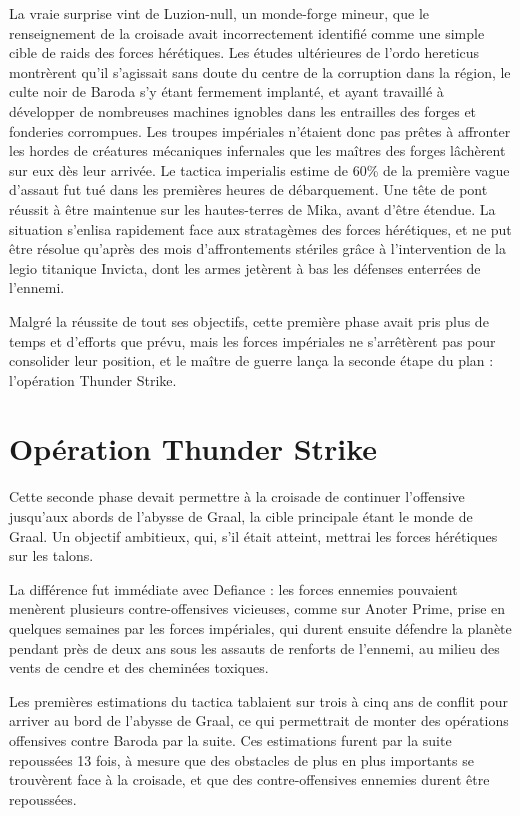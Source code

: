 \documentclass[10pt,a4paper]{book}
\begin{document}
La vraie surprise vint de Luzion-null, un monde-forge mineur, que le renseignement de la croisade avait incorrectement identifié comme une simple cible de raids des forces hérétiques. Les études ultérieures de l'ordo hereticus montrèrent qu'il s'agissait sans doute du centre de la corruption dans la région, le culte noir de Baroda s'y étant fermement implanté, et ayant travaillé à développer de nombreuses machines ignobles dans les entrailles des forges et fonderies corrompues. Les troupes impériales n'étaient donc pas prêtes à affronter les hordes de créatures mécaniques infernales que les maîtres des forges lâchèrent sur eux dès leur arrivée. Le tactica imperialis estime de 60\% de la première vague d'assaut fut tué dans les premières heures de débarquement. Une tête de pont réussit à être maintenue sur les hautes-terres de Mika, avant d'être étendue. La situation s'enlisa rapidement face aux stratagèmes des forces hérétiques, et ne put être résolue qu'après des mois d'affrontements stériles grâce à l'intervention de la legio titanique Invicta, dont les armes jetèrent à bas les défenses enterrées de l'ennemi.

Malgré la réussite de tout ses objectifs, cette première phase avait pris plus de temps et d'efforts que prévu, mais les forces impériales ne s'arrêtèrent pas pour consolider leur position, et le maître de guerre lança la seconde étape du plan : l'opération Thunder Strike.
\section{Opération Thunder Strike}
Cette seconde phase devait permettre à la croisade de continuer l'offensive jusqu'aux abords de l'abysse de Graal, la cible principale étant le monde de Graal. Un objectif ambitieux, qui, s'il était atteint, mettrai les forces hérétiques sur les talons.

La différence fut immédiate avec Defiance : les forces ennemies pouvaient menèrent plusieurs contre-offensives vicieuses, comme sur Anoter Prime, prise en quelques semaines par les forces impériales, qui durent ensuite défendre la planète pendant près de deux ans sous les assauts de renforts de l'ennemi, au milieu des vents de cendre et des cheminées toxiques.

Les premières estimations du tactica tablaient sur trois à cinq ans de conflit pour arriver au bord de l'abysse de Graal, ce qui permettrait de monter des opérations offensives contre Baroda par la suite. Ces estimations furent par la suite repoussées 13 fois, à mesure que des obstacles de plus en plus importants se trouvèrent face à la croisade, et que des contre-offensives ennemies durent être repoussées. 
\end{document}

